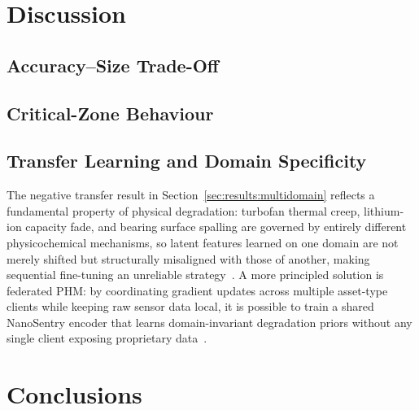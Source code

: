 \documentclass[AMA,Times1COL]{WileyNJDv5}
\begin{document}

\section{Discussion}\label{sec:discussion}

\subsection{Accuracy--Size Trade-Off}\label{sec:disc:tradeoff}

\subsection{Critical-Zone Behaviour}\label{sec:disc:critical}

\subsection{Transfer Learning and Domain Specificity}\label{sec:disc:transfer}
The negative transfer result in Section~\ref{sec:results:multidomain}
reflects a fundamental property of physical degradation: turbofan
thermal creep, lithium-ion capacity fade, and bearing surface spalling
are governed by entirely different physicochemical mechanisms, so latent
features learned on one domain are not merely shifted but structurally
misaligned with those of another, making sequential fine-tuning an
unreliable strategy~\cite{Jiang2026}.
A more principled solution is federated PHM: by coordinating gradient
updates across multiple asset-type clients while keeping raw sensor
data local, it is possible to train a shared NanoSentry encoder that
learns domain-invariant degradation priors without any single client
exposing proprietary data~\cite{Almeida2026}.

\section{Conclusions}\label{sec:conclusions}
\end{document}
